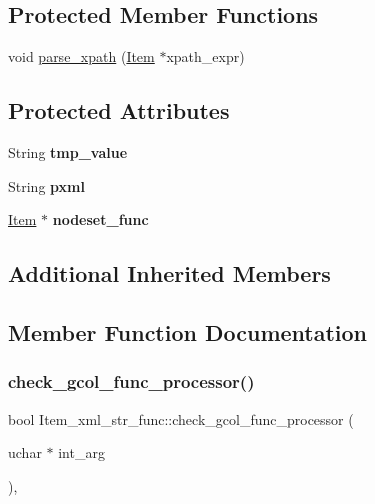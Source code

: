 \subsection*{Protected Member Functions}
\begin{DoxyCompactItemize}
\item 
void \mbox{\hyperlink{classItem__xml__str__func_a7c2efc73a06fa01687872597b15fdff4}{parse\+\_\+xpath}} (\mbox{\hyperlink{classItem}{Item}} $\ast$xpath\+\_\+expr)
\end{DoxyCompactItemize}
\subsection*{Protected Attributes}
\begin{DoxyCompactItemize}
\item 
\mbox{\label{classItem__xml__str__func_a9c7d871b7f0351f1f6c0764c502a19b7}} 
String {\bfseries tmp\+\_\+value}
\item 
\mbox{\label{classItem__xml__str__func_a08045079b952e998abe8f95915d56158}} 
String {\bfseries pxml}
\item 
\mbox{\label{classItem__xml__str__func_a2c2bf1507c32a06e671a82fe11ac1d27}} 
\mbox{\hyperlink{classItem}{Item}} $\ast$ {\bfseries nodeset\+\_\+func}
\end{DoxyCompactItemize}
\subsection*{Additional Inherited Members}


\subsection{Member Function Documentation}
\mbox{\label{classItem__xml__str__func_aad586261f128e8819704b29bdf0c0470}} 
\subsubsection{\texorpdfstring{check\+\_\+gcol\+\_\+func\+\_\+processor()}{check\_gcol\_func\_processor()}}
{\footnotesize\ttfamily bool Item\+\_\+xml\+\_\+str\+\_\+func\+::check\+\_\+gcol\+\_\+func\+\_\+processor (\begin{DoxyParamCaption}\item[{uchar $\ast$}]{int\+\_\+arg }\end{DoxyParamCaption})\hspace{0.3cm}{\ttfamily [inline]}, {\ttfamily [virtual]}}

